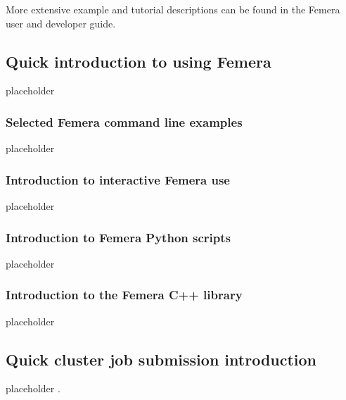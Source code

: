 More extensive example and tutorial descriptions can be found in the
Femera user and developer guide.

\subsection{Quick introduction to using Femera\label{subsec:quick-intro}}

placeholder

\subsubsection{Selected Femera command line examples\label{subsec:cli-examples}}

placeholder

\subsubsection{Introduction to interactive Femera use
\label{subsec:Intro-python-interactive}}

placeholder

\subsubsection{Introduction to Femera Python scripts
\label{subsec:Intro-python-script}}

placeholder

\subsubsection{Introduction to the Femera C++ library
\label{subsec:Intro-cpp}}

placeholder

\subsection{Quick cluster job submission introduction
\label{subsec:Intro-cluster-job}}

placeholder
.
